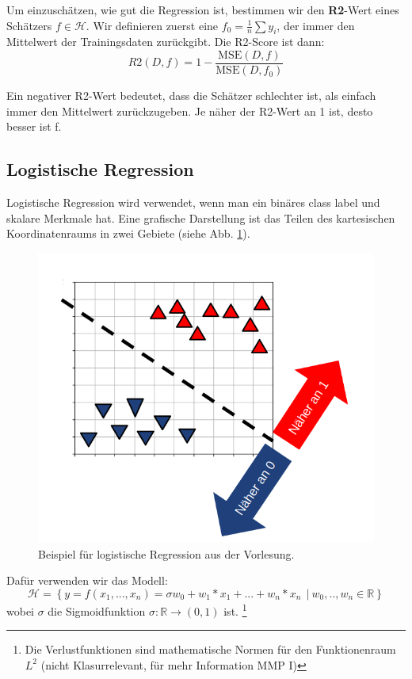 Um einzuschätzen, wie gut die Regression ist, bestimmen wir den \textbf{R2}-Wert eines Schätzers $f \in \mathcal{H}$. Wir definieren zuerst eine $f_0 = \frac{1}{n}\sum y_i$, der immer den Mittelwert der Trainingsdaten zurückgibt. Die R2-Score ist dann:
\begin{equation}
    R2(D,f) = 1 - \frac{\mathrm{MSE}(D,f)}{\mathrm{MSE}(D,f_0)}
\end{equation}


Ein negativer R2-Wert bedeutet, dass die Schätzer schlechter ist, als einfach immer den Mittelwert zurückzugeben. Je näher der R2-Wert an 1 ist, desto besser ist f. 

\subsection{Logistische Regression}
Logistische Regression wird verwendet, wenn man ein binäres class label und skalare Merkmale hat. Eine grafische Darstellung ist das Teilen des kartesischen Koordinatenraums in zwei Gebiete (siehe Abb. \ref{fig:ml-div}).

\begin{figure}[h]
    \centering
    \includegraphics[scale=0.27]{Figures/ML-divided space.png}
    \caption{Beispiel für logistische Regression aus der Vorlesung.}
    \label{fig:ml-div}
\end{figure}

Dafür verwenden wir das Modell:
\begin{equation}
        \mathcal{H} = \left\{ y=f(x_1,...,x_n) = \sigma{w_0 + w_1*x_1 + ... + w_n*x_n} ~~|~w_0,..,w_n \in \mathbb{R}\right\}
\end{equation}
wobei  $\sigma$ die Sigmoidfunktion $\sigma: \mathbb{R} \to (0,1)$ ist. \footnote{Die Verlustfunktionen sind mathematische Normen für den Funktionenraum $L^2$ (nicht Klasurrelevant, für mehr Information MMP I)}

